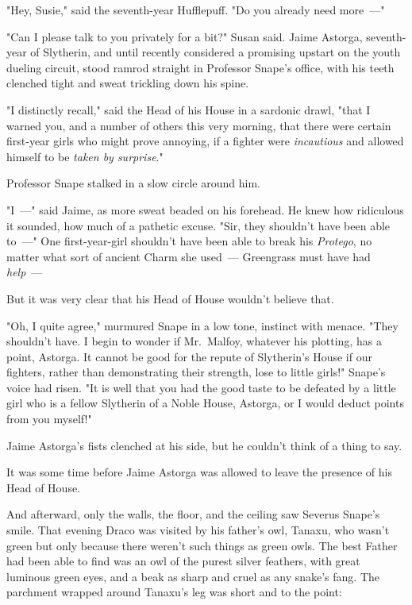 "Hey, Susie," said the seventh-year Hufflepuff. "Do you already need more~---"

"Can I please talk to you privately for a bit?" Susan said.
\sbreak
Jaime Astorga, seventh-year of Slytherin, and until recently considered a
promising upstart on the youth dueling circuit, stood ramrod straight in
Professor Snape's office, with his teeth clenched tight and sweat trickling
down his spine.

"I distinctly recall," said the Head of his House in a sardonic drawl, "that I
warned you, and a number of others this very morning, that there were certain
first-year girls who might prove annoying, if a fighter were \emph{incautious}
and allowed himself to be \emph{taken by surprise}."

Professor Snape stalked in a slow circle around him.

"I~---" said Jaime, as more sweat beaded on his forehead. He knew how ridiculous
it sounded, how much of a pathetic excuse. "Sir, they shouldn't have been able
to~---" One first-year-girl shouldn't have been able to break his
\emph{Protego}, no matter what sort of ancient Charm she used~--- Greengrass must
have had \emph{help}~---

But it was very clear that his Head of House wouldn't believe that.

"Oh, I quite agree," murmured Snape in a low tone, instinct with menace. "They
shouldn't have. I begin to wonder if Mr.~Malfoy, whatever his plotting, has a
point, Astorga. It cannot be good for the repute of Slytherin's House if our
fighters, rather than demonstrating their strength, lose to little girls!"
Snape's voice had risen. "It is well that you had the good taste to be defeated
by a little girl who is a fellow Slytherin of a Noble House, Astorga, or I
would deduct points from you myself!"

Jaime Astorga's fists clenched at his side, but he couldn't think of a thing to
say.

It was some time before Jaime Astorga was allowed to leave the presence of his
Head of House.

And afterward, only the walls, the floor, and the ceiling saw Severus Snape's
smile.
\sbreak
That evening Draco was visited by his father's owl, Tanaxu, who wasn't green
but only because there weren't such things as green owls. The best Father had
been able to find was an owl of the purest silver feathers, with great luminous
green eyes, and a beak as sharp and cruel as any snake's fang. The parchment
wrapped around Tanaxu's leg was short and to the point:

